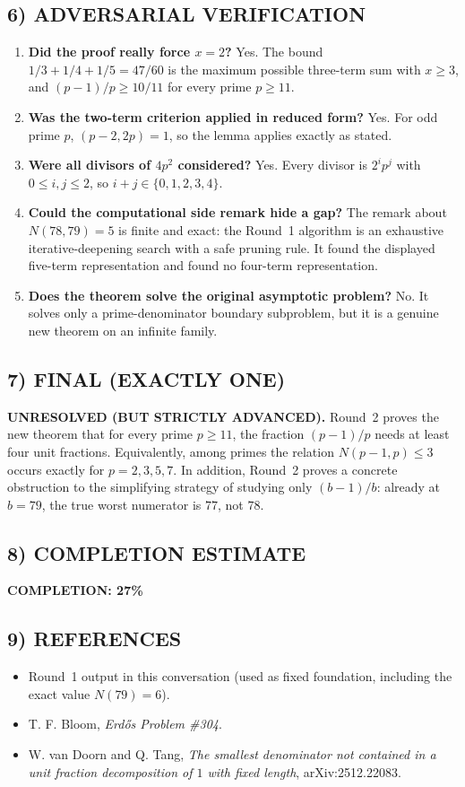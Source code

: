 \subsection*{6) ADVERSARIAL VERIFICATION}
\begin{enumerate}
\item \textbf{Did the proof really force \(x=2\)?}
Yes. The bound \(1/3+1/4+1/5=47/60\) is the maximum possible three-term sum with \(x\ge 3\), and \((p-1)/p\ge 10/11\) for every prime \(p\ge 11\).
\item \textbf{Was the two-term criterion applied in reduced form?}
Yes. For odd prime \(p\), \((p-2,2p)=1\), so the lemma applies exactly as stated.
\item \textbf{Were all divisors of \(4p^2\) considered?}
Yes. Every divisor is \(2^i p^j\) with \(0\le i,j\le 2\), so \(i+j\in\{0,1,2,3,4\}\).
\item \textbf{Could the computational side remark hide a gap?}
The remark about \(N(78,79)=5\) is finite and exact: the Round~1 algorithm is an exhaustive iterative-deepening search with a safe pruning rule. It found the displayed five-term representation and found no four-term representation.
\item \textbf{Does the theorem solve the original asymptotic problem?}
No. It solves only a prime-denominator boundary subproblem, but it is a genuine new theorem on an infinite family.
\end{enumerate}

\subsection*{7) FINAL (EXACTLY ONE)}
\textbf{UNRESOLVED (BUT STRICTLY ADVANCED).}
Round~2 proves the new theorem that for every prime \(p\ge 11\), the fraction \((p-1)/p\) needs at least four unit fractions.
Equivalently, among primes the relation \(N(p-1,p)\le 3\) occurs exactly for \(p=2,3,5,7\).
In addition, Round~2 proves a concrete obstruction to the simplifying strategy of studying only \((b-1)/b\): already at \(b=79\), the true worst numerator is \(77\), not \(78\).

\subsection*{8) COMPLETION ESTIMATE}
\textbf{COMPLETION: 27\%}

\subsection*{9) REFERENCES}
\begin{itemize}
\item Round~1 output in this conversation (used as fixed foundation, including the exact value \(N(79)=6\)).
\item T. F. Bloom, \emph{Erd\H{o}s Problem \#304}.
\item W. van Doorn and Q. Tang, \emph{The smallest denominator not contained in a unit fraction decomposition of \(1\) with fixed length}, arXiv:2512.22083.
\end{itemize}


